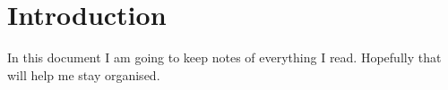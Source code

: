 \chapter{Introduction}

In this document I am going to keep notes of everything I read. Hopefully that will help me stay organised.